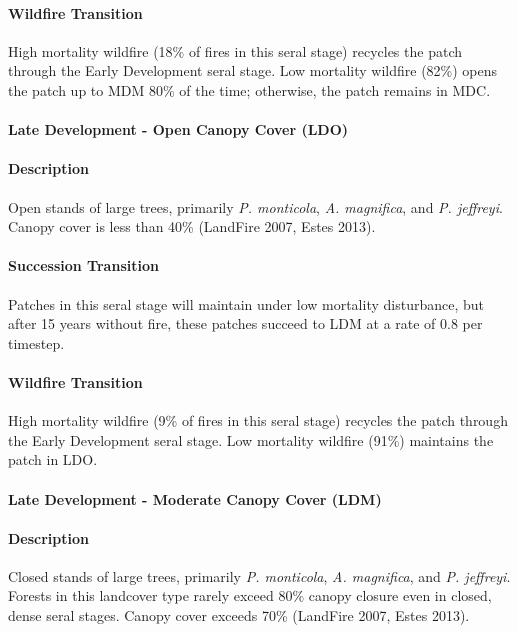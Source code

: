 \paragraph{Wildfire Transition} High mortality wildfire (18\% of fires in this seral stage) recycles the patch through the Early Development seral stage. Low mortality wildfire (82\%) opens the patch up to MDM 80\% of the time; otherwise, the patch remains in MDC.

\noindent\hrulefill


\paragraph{Late Development - Open Canopy Cover (LDO)}

\paragraph{Description} Open stands of large trees, primarily \emph{P. monticola}, \emph{A. magnifica}, and \emph{P. jeffreyi}. Canopy cover is less than 40\% (LandFire 2007, Estes 2013).

\paragraph{Succession Transition} Patches in this seral stage will maintain under low mortality disturbance, but after 15 years without fire, these patches succeed to LDM at a rate of 0.8 per timestep.

\paragraph{Wildfire Transition} High mortality wildfire (9\% of fires in this seral stage) recycles the patch through the Early Development seral stage. Low mortality wildfire (91\%) maintains the patch in LDO.

\noindent\hrulefill

\paragraph{Late Development - Moderate Canopy Cover (LDM)}

\paragraph{Description} Closed stands of large trees, primarily \emph{P. monticola}, \emph{A. magnifica}, and \emph{P. jeffreyi}. Forests in this landcover type rarely exceed 80\% canopy closure even in closed, dense seral stages. Canopy cover exceeds 70\% (LandFire 2007, Estes 2013).


